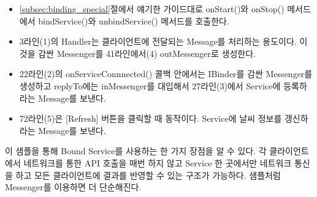 \begin{itemize}
\item \ref{subsec:binding_special}절에서 얘기한 가이드대로 onStart()와 onStop() 메서드에서 bindService()와 unbindService() 메서드를 호출한다.
\item 3라인(1)의 Handler는 클라이언트에 전달되는 Message를 처리하는 용도이다. 이것을 감싼 Messenger를 41라인에서(4) outMessenger로 생성한다.
\item 22라인(2)의 onServiceConnnected() 콜백 안에서는 IBinder를 감싼 Messenger를 생성하고 replyTo에는 inMessenger를 대입해서 27라인(3)에서 Service에 등록하라는 Message를  보낸다.
\item 72라인(5)은 [Refresh] 버튼을 클릭할 때 동작이다. Service에 날씨 정보를 갱신하라는 Message를 보낸다.
\end{itemize}

이 샘플을 통해 Bound Service를 사용하는 한 가지 장점을 알 수 있다. 각 클라이언트에서 네트워크를 통한 API 호출을 매번 하지 않고 Service 한 곳에서만 네트워크 통신을 하고 모든 클라이언트에 결과를 반영할 수 있는 구조가 가능하다. 샘플처럼  Messenger를 이용하면 더 단순해진다.
